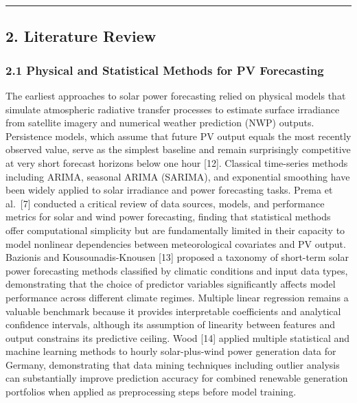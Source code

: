 \documentclass[
  11pt,
]{article}
\begin{document}
\begin{center}\rule{0.5\linewidth}{0.5pt}\end{center}

\subsection{2. Literature Review}\label{literature-review}

\subsubsection{2.1 Physical and Statistical Methods for PV
Forecasting}\label{physical-and-statistical-methods-for-pv-forecasting}

The earliest approaches to solar power forecasting relied on physical
models that simulate atmospheric radiative transfer processes to
estimate surface irradiance from satellite imagery and numerical weather
prediction (NWP) outputs. Persistence models, which assume that future
PV output equals the most recently observed value, serve as the simplest
baseline and remain surprisingly competitive at very short forecast
horizons below one hour {[}12{]}. Classical time-series methods
including ARIMA, seasonal ARIMA (SARIMA), and exponential smoothing have
been widely applied to solar irradiance and power forecasting tasks.
Prema et al.~{[}7{]} conducted a critical review of data sources,
models, and performance metrics for solar and wind power forecasting,
finding that statistical methods offer computational simplicity but are
fundamentally limited in their capacity to model nonlinear dependencies
between meteorological covariates and PV output. Bazionis and
Kousounadis-Knousen {[}13{]} proposed a taxonomy of short-term solar
power forecasting methods classified by climatic conditions and input
data types, demonstrating that the choice of predictor variables
significantly affects model performance across different climate
regimes. Multiple linear regression remains a valuable benchmark because
it provides interpretable coefficients and analytical confidence
intervals, although its assumption of linearity between features and
output constrains its predictive ceiling. Wood {[}14{]} applied multiple
statistical and machine learning methods to hourly solar-plus-wind power
generation data for Germany, demonstrating that data mining techniques
including outlier analysis can substantially improve prediction accuracy
for combined renewable generation portfolios when applied as
preprocessing steps before model training.
\end{document}
